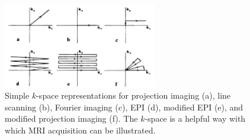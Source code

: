 \begin{figure}[!ht]
	\centering
	\includegraphics[width=0.6\textwidth, clip=true]{./Chapters/01_Introduction/Images/Kspace}
	\caption{Simple $k$-space representations \cite{Ljunggren1983} for projection imaging (a), line scanning (b), Fourier imaging (c), EPI (d), modified EPI (e), and modified projection imaging (f). The $k$-space is a helpful way with which MRI acquisition can be illustrated.}
	\label{fig:kspace}
\end{figure}